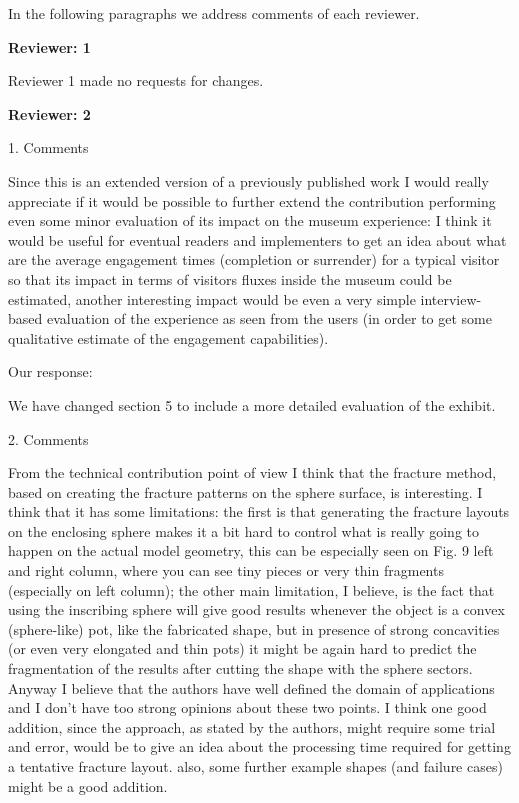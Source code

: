 \documentclass[acmlarge,screen,dvipsnames]{acmart}
\begin{document}
In the following paragraphs we address comments of each reviewer.

\greenEnd


\textbf{Reviewer: 1}

Reviewer 1 made no requests for changes.

\textbf{Reviewer: 2}

1. Comments

Since this is an extended version of a previously published work I would really appreciate if it would be possible to further extend the contribution performing even some minor evaluation of its impact on the museum experience: I think it would be useful for eventual readers and implementers to get an idea about what are the average engagement times (completion or surrender) for a typical visitor so that its impact in terms of visitors fluxes inside the museum could be estimated, another interesting impact would be even a very simple interview-based evaluation of the experience as seen from the users (in order to get some qualitative estimate of the engagement capabilities).

\greenBegin


Our response:

We have changed section 5 to include a more detailed evaluation of the exhibit.

\greenEnd



2. Comments

From the technical contribution point of view I think that the fracture method, based on creating the fracture patterns on the sphere surface, is interesting. 
I think that it has some limitations: the first is that generating the fracture layouts on the enclosing sphere makes it a bit hard to control what is really going to happen on the actual model geometry, this can be especially seen on Fig. 9 left and right column, where you can see tiny pieces or very thin fragments (especially on left column); the other main limitation, I believe, is the fact that using the inscribing sphere will give good results whenever the object is a convex (sphere-like) pot, like the fabricated shape, but in presence of strong concavities (or even very elongated and thin pots)  it might be again hard to predict the fragmentation of the results after cutting the shape with the sphere sectors. 
Anyway I believe that the authors have well defined the domain of applications and I don't have too strong opinions about these two points. I think one good addition, since the approach, as stated by the authors, might require some trial and error, would be to give an idea about the processing time required for getting a tentative fracture layout.
also, some further example shapes (and failure cases) might be a good addition.
\end{document}
